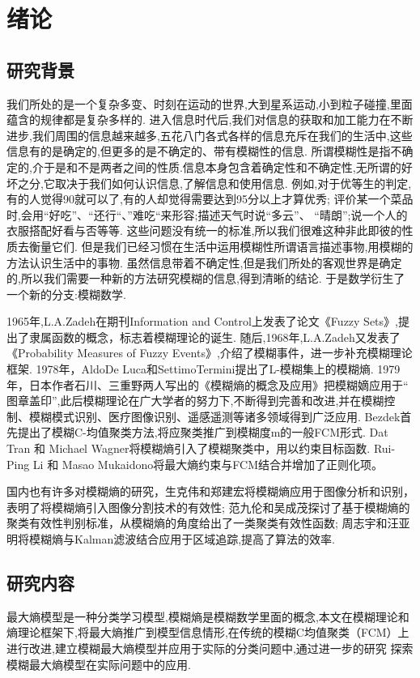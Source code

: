 \chapter[绪论]{绪论}
\section{研究背景}
\par
我们所处的是一个复杂多变、时刻在运动的世界,大到星系运动,小到粒子碰撞,里面蕴含的规律都是复杂多样的.
进入信息时代后,我们对信息的获取和加工能力在不断进步,我们周围的信息越来越多,五花八门各式各样的信息充斥在我们的生活中,这些信息有的是确定的,但更多的是不确定的、带有模糊性的信息.
所谓模糊性是指不确定的,介于是和不是两者之间的性质.信息本身包含着确定性和不确定性,无所谓的好坏之分,它取决于我们如何认识信息,了解信息和使用信息.
例如,对于优等生的判定,有的人觉得90就可以了,有的人却觉得需要达到95分以上才算优秀;
评价某一个菜品时,会用“好吃”、“还行“、”难吃“来形容;描述天气时说“多云”、 “晴朗”;说一个人的衣服搭配好看与否等等.
这些问题没有统一的标准,所以我们很难这种非此即彼的性质去衡量它们.
但是我们已经习惯在生活中运用模糊性所谓语言描述事物,用模糊的方法认识生活中的事物.
虽然信息带着不确定性,但是我们所处的客观世界是确定的,所以我们需要一种新的方法研究模糊的信息,得到清晰的结论.
于是数学衍生了一个新的分支:模糊数学.
\par
1965年,L.A.Zadeh在期刊Information and Control上发表了论文《Fuzzy Sets》\cite{ZADEH1965fuzzy},提出了隶属函数的概念，标志着模糊理论的诞生.
随后,1968年,L.A.Zadeh又发表了《Probability Measures of Fuzzy Events》\cite{zadeh1968probability},介绍了模糊事件，进一步补充模糊理论框架.
1978年，AldoDe Luca和SettimoTermini提出了L-模糊集上的模糊熵.
1979年，日本作者石川、三重野两人写出的《模糊熵的概念及应用》把模糊嫡应用于“ 图章盖印”,此后模糊理论在广大学者的努力下,不断得到完善和改进,并在模糊控制、模糊模式识别、医疗图像识别、遥感遥测等诸多领域得到广泛应用.
Bezdek首先提出了模糊C-均值聚类方法\cite{刘敬伟2007Bezdek},将应聚类推广到模糊度m的一般FCM形式.
Dat Tran 和 Michael Wagner\cite{2000Fuzzy}将模糊熵引入了模糊聚类中，用以约束目标函数.
Rui-Ping Li 和 Masao Mukaidono\cite{1995A}将最大熵约束与FCM结合并增加了正则化项。
\par 
国内也有许多对模糊熵的研究，生克伟和郑建宏\cite{生克伟1998一种新的模糊熵图象分割方法}将模糊熵应用于图像分析和识别，表明了将模糊熵引入图像分割技术的有效性;
范九伦和吴成茂\cite{范九伦2001基于模糊熵的聚类有效性函数}探讨了基于模糊熵的聚类有效性判别标准，从模糊熵的角度给出了一类聚类有效性函数;
周志宇和汪亚明将模糊熵与Kalman滤波结合应用于区域追踪,提高了算法的效率.
\section{研究内容}
最大熵模型是一种分类学习模型,模糊熵是模糊数学里面的概念,本文在模糊理论和熵理论框架下,将最大熵推广到模型信息情形,在传统的模糊C均值聚类（FCM）上进行改进,建立模糊最大熵模型并应用于实际的分类问题中,通过进一步的研究 探索模糊最大熵模型在实际问题中的应用.
